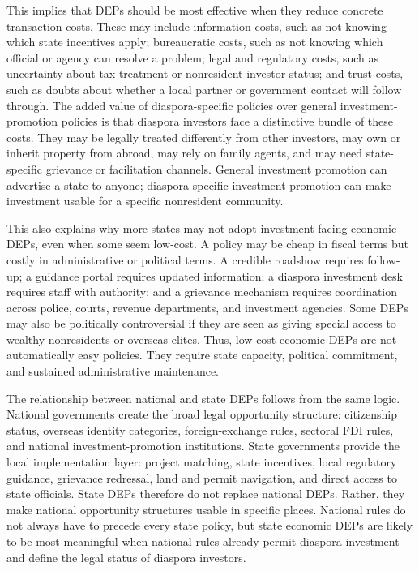 \documentclass[doublespace,nopageskip]{UVAthesis}
\begin{document}
This implies that DEPs should be most effective when they reduce concrete transaction costs. These may include information costs, such as not knowing which state incentives apply; bureaucratic costs, such as not knowing which official or agency can resolve a problem; legal and regulatory costs, such as uncertainty about tax treatment or nonresident investor status; and trust costs, such as doubts about whether a local partner or government contact will follow through. The added value of diaspora-specific policies over general investment-promotion policies is that diaspora investors face a distinctive bundle of these costs. They may be legally treated differently from other investors, may own or inherit property from abroad, may rely on family agents, and may need state-specific grievance or facilitation channels. General investment promotion can advertise a state to anyone; diaspora-specific investment promotion can make investment usable for a specific nonresident community.

This also explains why more states may not adopt investment-facing economic DEPs, even when some seem low-cost. A policy may be cheap in fiscal terms but costly in administrative or political terms. A credible roadshow requires follow-up; a guidance portal requires updated information; a diaspora investment desk requires staff with authority; and a grievance mechanism requires coordination across police, courts, revenue departments, and investment agencies. Some DEPs may also be politically controversial if they are seen as giving special access to wealthy nonresidents or overseas elites. Thus, low-cost economic DEPs are not automatically easy policies. They require state capacity, political commitment, and sustained administrative maintenance.

The relationship between national and state DEPs follows from the same logic. National governments create the broad legal opportunity structure: citizenship status, overseas identity categories, foreign-exchange rules, sectoral FDI rules, and national investment-promotion institutions. State governments provide the local implementation layer: project matching, state incentives, local regulatory guidance, grievance redressal, land and permit navigation, and direct access to state officials. State DEPs therefore do not replace national DEPs. Rather, they make national opportunity structures usable in specific places. National rules do not always have to precede every state policy, but state economic DEPs are likely to be most meaningful when national rules already permit diaspora investment and define the legal status of diaspora investors.
\end{document}

